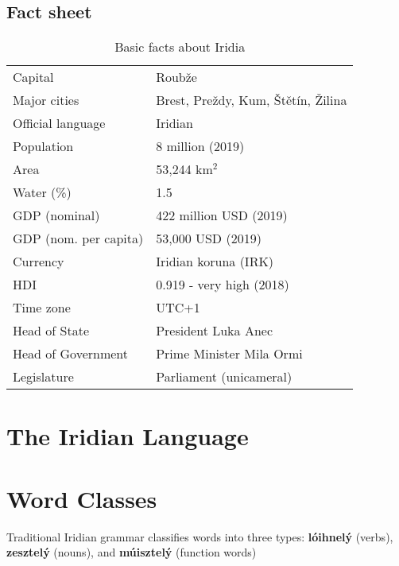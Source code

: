\subsection{Fact sheet}
\begin{table}
\centering \begin{tabular}{ll} \hline
Capital & Roubže \\
Major cities & Brest, Preždy, Kum, Štětín, Žilina \\
Official language & Iridian \\
Population & 8 million (2019) \\
Area & 53,244 km$^2$ \\
Water (\%) & 1.5 \\
GDP (nominal) & 422 million USD (2019) \\
GDP (nom. per capita) & 53,000 USD (2019) \\
Currency & Iridian koruna (IRK) \\
HDI & 0.919 - very high (2018) \\
Time zone & UTC+1 \\
Head of State & President Luka Anec \\
Head of Government & Prime Minister Mila Ormi \\
Legislature & Parliament (unicameral)\\
\hline
\end{tabular}
\caption{Basic facts about Iridia}
\label{tab:fact-sheet}
\end{table}


\section{The Iridian Language}


\section{Word Classes}\label{sec:wordclasses}
Traditional Iridian grammar classifies words into three types: \textbf{lóihnelý} (verbs), \textbf{zesztelý} (nouns), and \textbf{múisztelý} (function words)
